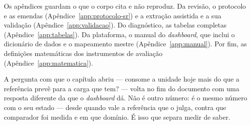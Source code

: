 Os apêndices guardam o que o corpo cita e não reproduz. Da revisão, o
protocolo e as emendas (Apêndice~\ref{app:protocolo-sr}) e a extração
assistida e a sua validação (Apêndice~\ref{app:validacao}). Do diagnóstico,
as tabelas completas (Apêndice~\ref{app:tabelas}). Da plataforma, o manual
do \emph{dashboard}, que inclui o dicionário de dados e o mapeamento mestre
(Apêndice~\ref{app:manual}). Por fim, as definições matemáticas dos
instrumentos de avaliação (Apêndice~\ref{app:matematica}).

A pergunta com que o capítulo abriu --- consome a unidade hoje mais do
que a referência prevê para a carga que tem? --- volta no fim do
documento com uma resposta diferente da que o \emph{dashboard} dá.
Não é outro número: é o mesmo número com o seu estado --- desde
quando vale a referência que o julga, contra que comparador foi medida e
em que domínio. É isso que separa medir de saber.
